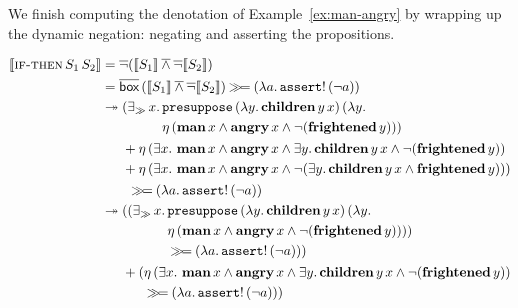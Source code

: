 We finish computing the denotation of Example~\ref{ex:man-angry} by
wrapping up the dynamic negation: negating and asserting the propositions.

\begin{align*}
  \sem{\app{\abs{if-then}}{S_1}{S_2}}
  &= \dnot (\sem{S_1} \dand \dnot \sem{S_2}) \\
  &= \ap{\DBOX}{(\sem{S_1} \dand \dnot \sem{S_2})} \hsbind (\lam{a}{\ap{\op{assert}!}{(\lnot a)}}) \\
  &\tto \begin{aligned}[t]
    &(\existsr x.\, \begin{aligned}[t]
         &\app{\op{presuppose}}{(\lam{y}{\app{\obj{children}}{y}{x}})}{(\lam{y}{ \\
         &\etaE{(\ap{\obj{man}}{x} \land \ap{\obj{angry}}{x} \land \lnot (\ap{\obj{frightened}}{y}))}})}
       \end{aligned} \\
    &+ \etaE{(\exists x.\ \ap{\obj{man}}{x} \land \ap{\obj{angry}}{x} \land
              \exists y.\, \app{\obj{children}}{y}{x} \land
              \lnot (\ap{\obj{frightened}}{y}))} \\
    &+ \etaE{(\exists x.\ \ap{\obj{man}}{x} \land \ap{\obj{angry}}{x} \land
              \lnot (\exists y.\, \app{\obj{children}}{y}{x} \land
              \ap{\obj{frightened}}{y}))})
    \end{aligned} \\
  &\qquad \hsbind (\lam{a}{\ap{\op{assert}!}{(\lnot a)}}) \\
  &\tto \begin{aligned}[t]
     &((\existsr x.\, \begin{aligned}[t]
         &\app{\op{presuppose}}{(\lam{y}{\app{\obj{children}}{y}{x}})}{(\lam{y}{ \\
         &\etaE{(\ap{\obj{man}}{x} \land \ap{\obj{angry}}{x} \land \lnot (\ap{\obj{frightened}}{y}))}})}) \\
         &\hsbind (\lam{a}{\ap{\op{assert}!}{(\lnot a)}})) \\
       \end{aligned} \\
     &+ (\begin{aligned}[t]
           &\etaE{(\exists x.\ \ap{\obj{man}}{x} \land \ap{\obj{angry}}{x} \land
                   \exists y.\, \app{\obj{children}}{y}{x} \land
                   \lnot (\ap{\obj{frightened}}{y}))} \\
           &\hsbind (\lam{a}{\ap{\op{assert}!}{(\lnot a)}}))

\end{aligned}
\end{aligned}
\end{align*}
